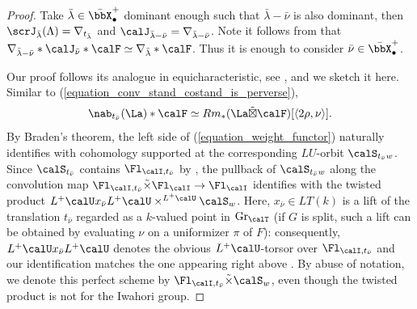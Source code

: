 \documentclass[10pt, reqno]{amsart}
\theoremstyle{plain}
\theoremstyle{definition}
\numberwithin{equation}{section}
\begin{document}
	\begin{proof}
		Take $\bar\lambda\in\bar{\bbX}_\bullet^+$ dominant enough such that $\bar\lambda-\bar\nu$ is also dominant, then $\scrJ_{\bar \lambda}(\Lambda)=\nabla_{t_{\bar \lambda}}$ and $\calJ_{\bar\lambda-\bar\nu}=\nabla_{\bar\lambda-\bar\nu}$. Note it follows from   that $\nabla_{\bar\lambda-\bar\nu}\ast \calJ_{\bar\nu}\ast \calF\simeq\nabla_{\bar\lambda}\ast \calF$. Thus it is enough to consider $\bar \nu \in \bar\bbX_\bullet^+$.  
		
		Our proof follows its analogue in equicharacteristic, see \cite[Lemma 4.5.8]{AR}, and we sketch it here. 
		Similar to (\ref{equation_conv_stand_costand_is_perverse}),
		$$\nab_{t_{\bar \nu}}(\La)\ast \calF \simeq Rm_* (\La \tilde{\boxtimes}  \calF) [\langle 2\rho, \nu\rangle ].$$
		By Braden's theorem, the left side of (\ref{equation_weight_functor}) naturally identifies with cohomology supported at the corresponding $LU$-orbit $\calS_{t_{\bar \nu}w}$. Since $\calS_{t_{\bar \nu}}$ contains $\Fl_{\calI,t_{\bar \nu}}$ by , the pullback of $\calS_{t_{\bar \nu}w}$ along the convolution map $\Fl_{\calI, t_{\bar \nu}} \tilde{\times} \Fl_\calI\rightarrow \Fl_\calI$ identifies with the twisted product $L^+\calU x_{\bar\nu}L^+\calU\times^{L^+\calU} \calS_w $. Here, $x_{\bar \nu} \in LT(k)$ is a lift of the translation $t_{\bar \nu}$ regarded as a $k$-valued point in $\mathrm{Gr}_{\calT}$ (if $G$ is split, such a lift can be obtained by evaluating $\nu$ on a uniformizer $\pi$ of $F$): consequently, $L^+\calU x_{\bar\nu}L^+\calU$ denotes the obvious $L^+\calU$-torsor over $\Fl_{\calI,t_{\bar \nu}}$ and our identification matches the one appearing right above \cite[Equation (4.5.11)]{AR}. 
		By abuse of notation, we denote this perfect scheme by $\Fl_{\calI,t_{\bar \nu}} \tilde{\times} \calS_w$, even though the twisted product is not for the Iwahori group.
		

\end{proof}
\end{document}
